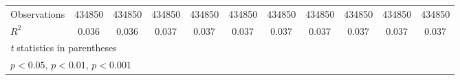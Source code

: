 {\begin{tabular}{l*{10}{c}}
\hline
Observations    &   434850         &   434850         &   434850         &   434850         &   434850         &   434850         &   434850         &   434850         &   434850         &   434850         \\
\(R^{2}\)       &    0.036         &    0.036         &    0.037         &    0.037         &    0.037         &    0.037         &    0.037         &    0.037         &    0.037         &    0.037         \\
\hline\hline
\multicolumn{11}{l}{\footnotesize \textit{t} statistics in parentheses}\\
\multicolumn{11}{l}{\footnotesize \sym{*} \(p<0.05\), \sym{**} \(p<0.01\), \sym{***} \(p<0.001\)}\\
\end{tabular}
}

